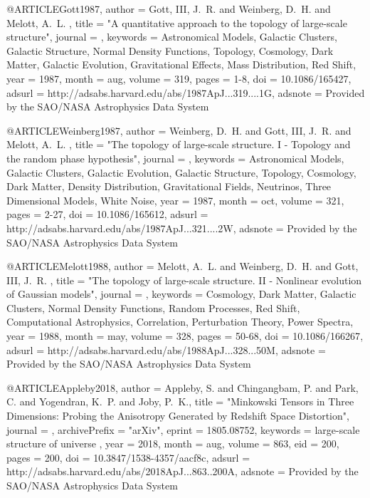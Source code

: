 \documentclass{aa}
\begin{document}
@ARTICLE{Gott1987,
   author = {{Gott}, III, J.~R. and {Weinberg}, D.~H. and {Melott}, A.~L.
	},
    title = "{A quantitative approach to the topology of large-scale structure}",
  journal = {\apj},
 keywords = {Astronomical Models, Galactic Clusters, Galactic Structure, Normal Density Functions, Topology, Cosmology, Dark Matter, Galactic Evolution, Gravitational Effects, Mass Distribution, Red Shift},
     year = 1987,
    month = aug,
   volume = 319,
    pages = {1-8},
      doi = {10.1086/165427},
   adsurl = {http://adsabs.harvard.edu/abs/1987ApJ...319....1G},
  adsnote = {Provided by the SAO/NASA Astrophysics Data System}
}

@ARTICLE{Weinberg1987,
   author = {{Weinberg}, D.~H. and {Gott}, III, J.~R. and {Melott}, A.~L.
	},
    title = "{The topology of large-scale structure. I - Topology and the random phase hypothesis}",
  journal = {\apj},
 keywords = {Astronomical Models, Galactic Clusters, Galactic Evolution, Galactic Structure, Topology, Cosmology, Dark Matter, Density Distribution, Gravitational Fields, Neutrinos, Three Dimensional Models, White Noise},
     year = 1987,
    month = oct,
   volume = 321,
    pages = {2-27},
      doi = {10.1086/165612},
   adsurl = {http://adsabs.harvard.edu/abs/1987ApJ...321....2W},
  adsnote = {Provided by the SAO/NASA Astrophysics Data System}
}

@ARTICLE{Melott1988,
   author = {{Melott}, A.~L. and {Weinberg}, D.~H. and {Gott}, III, J.~R.
	},
    title = "{The topology of large-scale structure. II - Nonlinear evolution of Gaussian models}",
  journal = {\apj},
 keywords = {Cosmology, Dark Matter, Galactic Clusters, Normal Density Functions, Random Processes, Red Shift, Computational Astrophysics, Correlation, Perturbation Theory, Power Spectra},
     year = 1988,
    month = may,
   volume = 328,
    pages = {50-68},
      doi = {10.1086/166267},
   adsurl = {http://adsabs.harvard.edu/abs/1988ApJ...328...50M},
  adsnote = {Provided by the SAO/NASA Astrophysics Data System}
}



@ARTICLE{Appleby2018,
   author = {{Appleby}, S. and {Chingangbam}, P. and {Park}, C. and {Yogendran}, K.~P. and 
	{Joby}, P.~K.},
    title = "{Minkowski Tensors in Three Dimensions: Probing the Anisotropy Generated by Redshift Space Distortion}",
  journal = {\apj},
archivePrefix = "arXiv",
   eprint = {1805.08752},
 keywords = {large-scale structure of universe },
     year = 2018,
    month = aug,
   volume = 863,
      eid = {200},
    pages = {200},
      doi = {10.3847/1538-4357/aacf8c},
   adsurl = {http://adsabs.harvard.edu/abs/2018ApJ...863..200A},
  adsnote = {Provided by the SAO/NASA Astrophysics Data System}
}
\end{document}
